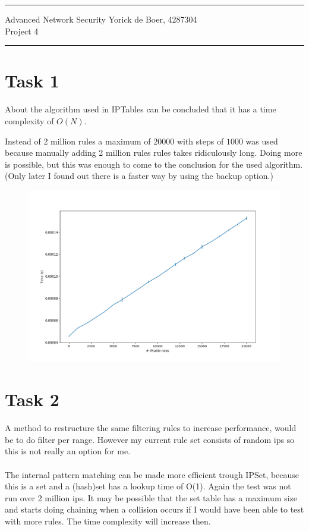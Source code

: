 \documentclass{article}
\begin{document}
\setcounter{MaxMatrixCols}{20}

\rule{\textwidth}{1pt}
Advanced Network Security \hfill Yorick de Boer, 4287304 \\
Project 4 \\
\rule{\textwidth}{1pt}
\vspace{0.5cm}

\section{Task 1}
About the algorithm used in IPTables can be concluded that it has a time complexity of $O(N)$.

Instead of 2 million rules a maximum of $20000$ with steps of $1000$ was used because manually adding 2 million rules rules takes ridiculously long. Doing more is possible, but this was enough to come to the conclusion for the used algorithm. (Only later I found out there is a faster way by using the backup option.)

\begin{figure}[H]
\includegraphics[scale=0.5]{task1}
\end{figure}

\section{Task 2}
A method to restructure the same filtering rules to increase performance, would be to do filter per range. However my current rule set consists of random ips so this is not really an option for me. \\
\\
The internal pattern matching can be made more efficient trough IPSet, because this is a set and a (hash)set has a lookup time of O(1). Again the test was not run over 2 million ips. It may be possible that the set table has a maximum size and starts doing chaining when a collision occurs if I would have been able to test with more rules. The time complexity will increase then.
\end{document}
